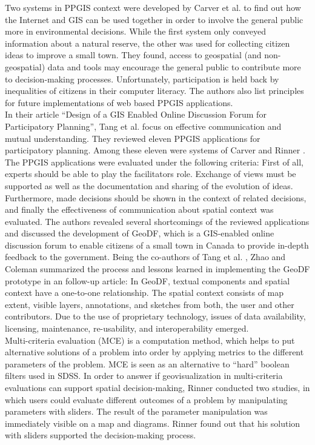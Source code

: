 Two systems in PPGIS context were developed by Carver et al. \cite{Carver2001_PPGIS_Cyberdemocracy} to find out how the Internet and GIS can be used together in order to involve the general public more in environmental decisions. While the first system only conveyed information about a natural reserve, the other was used for collecting citizen ideas to improve a small town. They found, access to geospatial (and non-geospatial) data and tools may encourage the general public to contribute more to decision-making processes. Unfortunately, participation is held back by inequalities of citizens in their computer literacy. The authors also list principles for future implementations of web based PPGIS applications.\\
In their article ``Design of a GIS Enabled Online Discussion Forum for Participatory Planning'', Tang et al. \cite{Tang2005_PPGIS_discussion_forum} focus on effective communication and mutual understanding. They reviewed eleven PPGIS applications for participatory planning. Among these eleven were systems of Carver \cite{Carver2001_PPGIS_Cyberdemocracy} and Rinner \cite{Rinner_ArgumentationMaps,Kessler2005_ArgumentationMapPrototype}. The PPGIS applications were evaluated under the following criteria: First of all, experts should be able to play the facilitators role. Exchange of views must be supported as well as the documentation and sharing of the evolution of ideas. Furthermore, made decisions should be shown in the context of related decisions, and finally the effectiveness of communication about spatial context was evaluated. The authors revealed several shortcomings of the reviewed applications and discussed the development of GeoDF, which is a GIS-enabled online discussion forum to enable citizens of a small town in Canada to provide in-depth feedback to the government. Being the co-authors of Tang et al. \cite{Tang2005_PPGIS_discussion_forum}, Zhao and Coleman \cite{zhao2006geodf} summarized the process and lessons learned in implementing the GeoDF prototype in an follow-up article: In GeoDF, textual components and spatial context have a one-to-one relationship. The spatial context consists of map extent, visible layers, annotations, and sketches from both, the user and other contributors. Due to the use of proprietary technology, issues of data availability, licensing, maintenance, re-usability, and interoperability emerged.\\
Multi-criteria evaluation (MCE) is a computation method, which helps to put alternative solutions of a problem into order by applying metrics to the different parameters of the problem. MCE is seen as an alternative to ``hard'' boolean filters used in SDSS. In order to answer if geovisualization in multi-criteria evaluations can support spatial decision-making, Rinner \cite{Rinner2007_geovis_decisionsupport} conducted two studies, in which users could evaluate different outcomes of a problem by manipulating parameters with sliders. The result of the parameter manipulation was immediately visible on a map and diagrams. Rinner found out that his solution with sliders supported the decision-making process.\\
